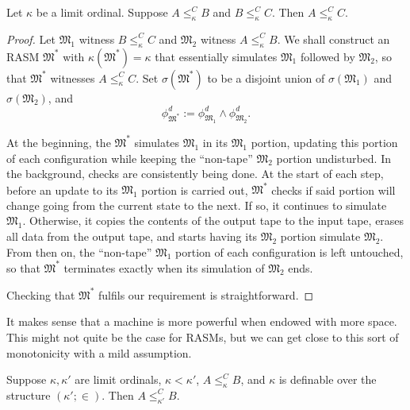 \documentclass[12pt]{article}
\numberwithin{equation}{section}
\begin{document}
\begin{prop}\label{prop245}
Let $\kappa$ be a limit ordinal. Suppose $A \leq^C_{\kappa} B$ and $B \leq^C_{\kappa} C$. Then $A \leq^C_{\kappa} C$.
\end{prop}

\begin{proof}
Let $\mathfrak{M}_1$ witness $B \leq^C_{\kappa} C$ and $\mathfrak{M}_2$ witness $A \leq^C_{\kappa} B$. We shall construct an RASM $\mathfrak{M}^*$ with $\kappa(\mathfrak{M}^*) = \kappa$ that essentially simulates $\mathfrak{M}_1$ followed by $\mathfrak{M}_2$, so that $\mathfrak{M}^*$ witnesses $A \leq^C_{\kappa} C$. Set $\sigma(\mathfrak{M}^*)$ to be a disjoint union of $\sigma(\mathfrak{M}_1)$ and $\sigma(\mathfrak{M}_2)$, and 
\begin{equation*}
    \phi^d_{\mathfrak{M}^*} := \phi^d_{\mathfrak{M}_1} \wedge \phi^d_{\mathfrak{M}_2} \text{.}
\end{equation*}

At the beginning, the $\mathfrak{M}^*$ simulates $\mathfrak{M}_1$ in its $\mathfrak{M}_1$ portion, updating this portion of each configuration while keeping the ``non-tape'' $\mathfrak{M}_2$ portion undisturbed. In the background, checks are consistently being done. At the start of each step, before an update to its $\mathfrak{M}_1$ portion is carried out, $\mathfrak{M}^*$ checks if said portion will change going from the current state to the next. If so, it continues to simulate $\mathfrak{M}_1$. Otherwise, it copies the contents of the output tape to the input tape, erases all data from the output tape, and starts having its $\mathfrak{M}_2$ portion simulate $\mathfrak{M}_2$. From then on, the ``non-tape'' $\mathfrak{M}_1$ portion of each configuration is left untouched, so that $\mathfrak{M}^*$ terminates exactly when its simulation of $\mathfrak{M}_2$ ends.

Checking that $\mathfrak{M}^*$ fulfils our requirement is straightforward.
\end{proof}

It makes sense that a machine is more powerful when endowed with more space. This might not quite be the case for RASMs, but we can get close to this sort of monotonicity with a mild assumption.

\begin{prop}\label{prop246}
Suppose $\kappa, \kappa'$ are limit ordinals, $\kappa < \kappa'$, $A \leq^C_{\kappa} B$, and $\kappa$ is definable over the structure $(\kappa'; \in)$. Then $A \leq^C_{\kappa'} B$.
\end{prop}
\end{document}
